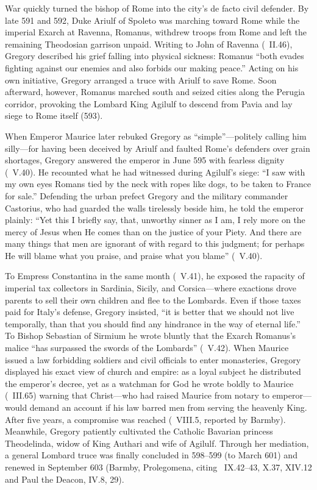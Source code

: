 War quickly turned the bishop of Rome into the city's de facto civil defender.
By late 591 and 592, Duke Ariulf of Spoleto was marching toward Rome while the
imperial Exarch at Ravenna, Romanus, withdrew troops from Rome and left the
remaining Theodosian garrison unpaid. Writing to John of Ravenna (\
II.46), Gregory described his grief falling into physical sickness: Romanus
``both evades fighting against our enemies and also forbids our making peace.''
Acting on his own initiative, Gregory arranged a truce with Ariulf to save
Rome. Soon afterward, however, Romanus marched south and seized cities along
the Perugia corridor, provoking the Lombard King Agilulf to descend from Pavia
and lay siege to Rome itself (593).

When Emperor Maurice later rebuked Gregory as ``simple''---politely calling him
silly---for having been deceived by Ariulf and faulted Rome's defenders over
grain shortages, Gregory answered the emperor in June 595 with fearless
dignity (\work{Ep.}\ V.40). He recounted what he had witnessed during Agilulf's
siege: ``I saw with my own eyes Romans tied by the neck with ropes like dogs,
to be taken to France for sale.'' Defending the urban prefect Gregory and the
military commander Castorius, who had guarded the walls tirelessly beside him,
he told the emperor plainly: ``Yet this I briefly say, that, unworthy sinner as
I am, I rely more on the mercy of Jesus when He comes than on the justice of
your Piety. And there are many things that men are ignorant of with regard to
this judgment; for perhaps He will blame what you praise, and praise what you
blame'' (\work{Ep.}\ V.40).

To Empress Constantina in the same month (\ V.41), he exposed the
rapacity of imperial tax collectors in Sardinia, Sicily, and Corsica---where
exactions drove parents to sell their own children and flee to the Lombards.
Even if those taxes paid for Italy's defense, Gregory insisted, ``it is better
that we should not live temporally, than that you should find any hindrance in
the way of eternal life.'' To Bishop Sebastian of Sirmium he wrote bluntly that
the Exarch Romanus's malice ``has surpassed the swords of the Lombards''
(\work{Ep.}\ V.42). When Maurice issued a law forbidding soldiers and civil
officials to enter monasteries, Gregory displayed his exact view of church and
empire: as a loyal subject he distributed the emperor's decree, yet as a
watchman for God he wrote boldly to Maurice (\work{Ep.}\ III.65) warning that
Christ---who had raised Maurice from notary to emperor---would demand an
account if his law barred men from serving the heavenly King. After five years,
a compromise was reached (\work{Ep.}\ VIII.5, reported by Barmby). Meanwhile,
Gregory patiently cultivated the Catholic Bavarian princess Theodelinda, widow
of King Authari and wife of Agilulf. Through her mediation, a general Lombard
truce was finally concluded in 598--599 (to March 601) and renewed in September
603 (Barmby, Prolegomena, citing \work{Ep.}\ IX.42--43, X.37, XIV.12 and Paul
the Deacon, \work{Historia Langobardorum} IV.8, 29).

